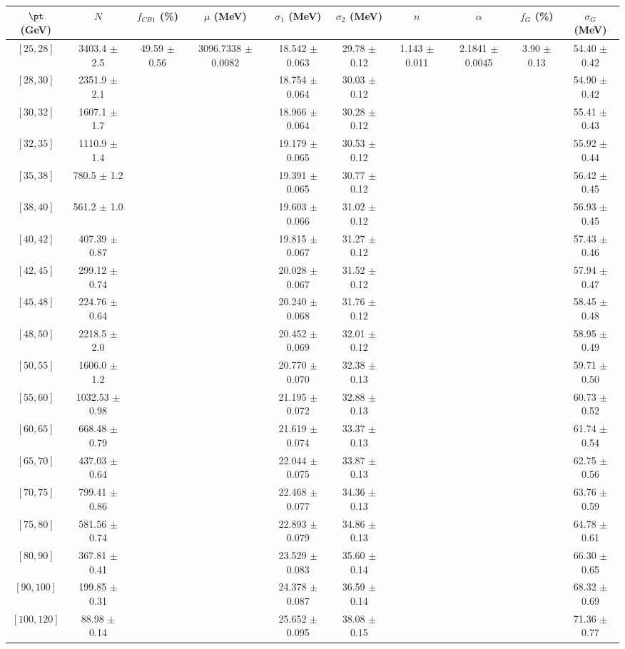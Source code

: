 \begin{tabular}{c||c|c|c|c|c|c|c|c|c}
$\pt$ (GeV) & $N$ & $f_{CB1}$ (\%)  & $\mu$ (MeV) & $\sigma_1$ (MeV) & $\sigma_2$ (MeV) & $n$ & $\alpha$ & $f_G$ (\%) & $\sigma_G$ (MeV) \\
\hline
$[25, 28]$ & 3403.4 $\pm$ 2.5 & \multirow{19}{*}{49.59 $\pm$ 0.56} & \multirow{19}{*}{3096.7338 $\pm$ 0.0082} & 18.542 $\pm$ 0.063 & 29.78 $\pm$ 0.12 & \multirow{19}{*}{1.143 $\pm$ 0.011} & \multirow{19}{*}{2.1841 $\pm$ 0.0045} & \multirow{19}{*}{3.90 $\pm$ 0.13} & 54.40 $\pm$ 0.42\\
$[28, 30]$ & 2351.9 $\pm$ 2.1 &  &  & 18.754 $\pm$ 0.064 & 30.03 $\pm$ 0.12 &  &  &  & 54.90 $\pm$ 0.42\\
$[30, 32]$ & 1607.1 $\pm$ 1.7 &  &  & 18.966 $\pm$ 0.064 & 30.28 $\pm$ 0.12 &  &  &  & 55.41 $\pm$ 0.43\\
$[32, 35]$ & 1110.9 $\pm$ 1.4 &  &  & 19.179 $\pm$ 0.065 & 30.53 $\pm$ 0.12 &  &  &  & 55.92 $\pm$ 0.44\\
$[35, 38]$ & 780.5 $\pm$ 1.2 &  &  & 19.391 $\pm$ 0.065 & 30.77 $\pm$ 0.12 &  &  &  & 56.42 $\pm$ 0.45\\
$[38, 40]$ & 561.2 $\pm$ 1.0 &  &  & 19.603 $\pm$ 0.066 & 31.02 $\pm$ 0.12 &  &  &  & 56.93 $\pm$ 0.45\\
$[40, 42]$ & 407.39 $\pm$ 0.87 &  &  & 19.815 $\pm$ 0.067 & 31.27 $\pm$ 0.12 &  &  &  & 57.43 $\pm$ 0.46\\
$[42, 45]$ & 299.12 $\pm$ 0.74 &  &  & 20.028 $\pm$ 0.067 & 31.52 $\pm$ 0.12 &  &  &  & 57.94 $\pm$ 0.47\\
$[45, 48]$ & 224.76 $\pm$ 0.64 &  &  & 20.240 $\pm$ 0.068 & 31.76 $\pm$ 0.12 &  &  &  & 58.45 $\pm$ 0.48\\
$[48, 50]$ & 2218.5 $\pm$ 2.0 &  &  & 20.452 $\pm$ 0.069 & 32.01 $\pm$ 0.12 &  &  &  & 58.95 $\pm$ 0.49\\
$[50, 55]$ & 1606.0 $\pm$ 1.2 &  &  & 20.770 $\pm$ 0.070 & 32.38 $\pm$ 0.13 &  &  &  & 59.71 $\pm$ 0.50\\
$[55, 60]$ & 1032.53 $\pm$ 0.98 &  &  & 21.195 $\pm$ 0.072 & 32.88 $\pm$ 0.13 &  &  &  & 60.73 $\pm$ 0.52\\
$[60, 65]$ & 668.48 $\pm$ 0.79 &  &  & 21.619 $\pm$ 0.074 & 33.37 $\pm$ 0.13 &  &  &  & 61.74 $\pm$ 0.54\\
$[65, 70]$ & 437.03 $\pm$ 0.64 &  &  & 22.044 $\pm$ 0.075 & 33.87 $\pm$ 0.13 &  &  &  & 62.75 $\pm$ 0.56\\
$[70, 75]$ & 799.41 $\pm$ 0.86 &  &  & 22.468 $\pm$ 0.077 & 34.36 $\pm$ 0.13 &  &  &  & 63.76 $\pm$ 0.59\\
$[75, 80]$ & 581.56 $\pm$ 0.74 &  &  & 22.893 $\pm$ 0.079 & 34.86 $\pm$ 0.13 &  &  &  & 64.78 $\pm$ 0.61\\
$[80, 90]$ & 367.81 $\pm$ 0.41 &  &  & 23.529 $\pm$ 0.083 & 35.60 $\pm$ 0.14 &  &  &  & 66.30 $\pm$ 0.65\\
$[90, 100]$ & 199.85 $\pm$ 0.31 &  &  & 24.378 $\pm$ 0.087 & 36.59 $\pm$ 0.14 &  &  &  & 68.32 $\pm$ 0.69\\
$[100, 120]$ & 88.98 $\pm$ 0.14 &  &  & 25.652 $\pm$ 0.095 & 38.08 $\pm$ 0.15 &  &  &  & 71.36 $\pm$ 0.77\\
\end{tabular}
